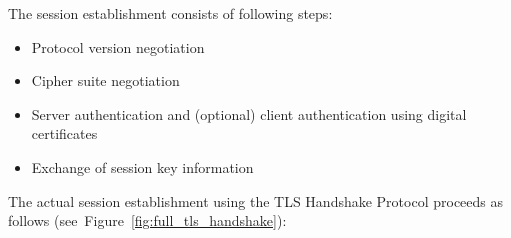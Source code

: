 
    \noindent The session establishment consists of following steps:
    \begin{itemize}
        \item Protocol version negotiation
        \item Cipher suite negotiation
        \item Server authentication and (optional) client authentication using
              digital certificates
        \item Exchange of session key information
    \end{itemize}

    \noindent The actual session establishment using the TLS Handshake Protocol
    proceeds as follows (see~Figure~\ref{fig:full_tls_handshake}):
